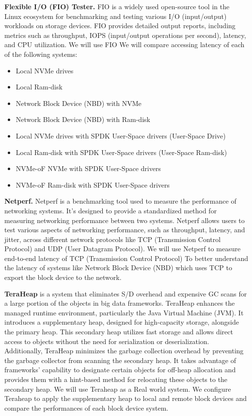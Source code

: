 \textbf{Flexible I/O (FIO) Tester.}
FIO is a widely used open-source tool in the Linux ecosystem for benchmarking
and testing various I/O (input/output) workloads on storage devices. FIO
provides detailed output reports, including metrics such as throughput, IOPS
(input/output operations per second), latency, and CPU utilization.  We  will use
FIO 
 We will compare accessing latency of each of the following systems: 
\begin{itemize}
    \item Local NVMe drives
    \item Local Ram-disk
    \item Network Block Device (NBD) with NVMe
    \item Network Block Device (NBD) with Ram-disk
    \item Local NVMe drives with SPDK User-Space drivers (User-Space Drive)
    \item Local Ram-disk with SPDK User-Space drivers (User-Space Ram-disk)
    \item NVMe-oF NVMe with SPDK User-Space drivers
    \item NVMe-oF Ram-disk with SPDK User-Space drivers
\end{itemize}
\vspace{1em}

\textbf{Netperf.} 
Netperf is a benchmarking tool used to measure the performance of networking
systems. It's designed to provide a standardized method for measuring networking
performance between two systems. Netperf allows users to test various aspects of
networking performance, such as throughput, latency, and jitter, across
different network protocols like TCP (Transmission Control Protocol) and UDP
(User Datagram Protocol). We will use Netperf to measure end-to-end latency of
TCP (Transmission Control Protocol) To better understand the latency of systems
like Network Block Device (NBD) which uses TCP to export the block device to the
network.
\vspace{1em}

\textbf{TeraHeap} is a system that eliminates S/D overhead and expensive GC scans for a
large portion of the objects in big data frameworks. TeraHeap enhances the
managed runtime environment, particularly the Java Virtual Machine (JVM). It
introduces a supplementary heap, designed for high-capacity storage, alongside
the primary heap. This secondary heap utilizes fast storage and allows direct
access to objects without the need for serialization or deserialization.
Additionally, TeraHeap minimizes the garbage collection overhead by preventing
the garbage collector from scanning the secondary heap. It takes advantage of
frameworks' capability to designate certain objects for off-heap allocation and
provides them with a hint-based method for relocating these objects to the
secondary heap. We will use Teraheap as a Real world system. We configure Teraheap to apply the supplementary heap to local and remote block devices and compare the performances of each block device system.
\vspace{1em}


